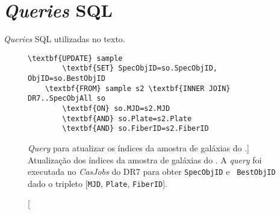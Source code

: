 



\chapter{{\em Queries} SQL}
\label{apendice:Queries}

{\em Queries} SQL utilizadas no texto. 

\begin{figure}
	\begin{Verbatim}[commandchars=\\\{\}]
	\textbf{UPDATE} sample
		\textbf{SET} SpecObjID=so.SpecObjID, ObjID=so.BestObjID
	\textbf{FROM} sample s2 \textbf{INNER JOIN} DR7..SpecObjAll so
		\textbf{ON} so.MJD=s2.MJD
		\textbf{AND} so.Plate=s2.Plate
		\textbf{AND} so.FiberID=s2.FiberID
	\end{Verbatim}
	\caption
	[{\em Query} para atualizar os índices da amostra de galáxias do
	\starlight.]
	{Atualização dos índices da amostra de galáxias do \starlight. A {\em query}
	foi executada no {\em CasJobs} do \SDSS DR7 para obter {\tt SpecObjID} e {\tt
	BestObjID} dado o tripleto [{\tt MJD}, {\tt Plate}, {\tt FiberID}].}
	\label{fig:AtualizaObjIds}
\end{figure}



